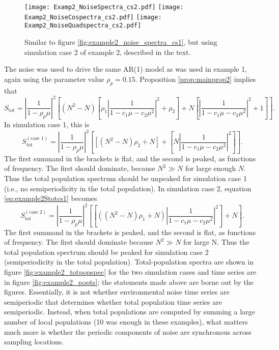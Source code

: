 \documentclass[letterpaper,11pt]{article}
\begin{document}
\begin{figure}
\texttt{[image: Examp2\_NoiseSpectra\_cs2.pdf]}
\texttt{[image: Examp2\_NoiseCospectra\_cs2.pdf]}
\texttt{[image: Examp2\_NoiseQuadspectra\_cs2.pdf]}
\caption{Similar to figure \ref{fig:example2_noise_spectra_cs1}, but using simulation case 2 of example 2, described in the text.}\label{fig:example2_noise_spectra_cs2}
\end{figure}

The noise was used to drive the same AR(1) model as was used in example 1,
again using the parameter value $\rho_p=0.15$. Proposition \ref{prop:mainprop2}
implies that 
\begin{equation}
S_{\text{tot}}=\left| \frac{1}{1-\rho_p \mu} \right|^2
\left[ (N^2-N) \left[ \rho_1 \left| \frac{1}{1-c_1 \mu -c_2 \mu^2} \right|^2+\rho_2 \right] + N\left[ \left| \frac{1}{1-c_1 \mu-c_2 \mu^2} \right|^2+1 \right] \right].
\label{eq:example2Stotcs1}
\end{equation}
In simulation case 1, this is
$$S_{\text{tot}}^{(\text{case 1})}=\left| \frac{1}{1-\rho_p \mu} \right|^2
\left[ [(N^2-N)\rho_2 +N] + \left[ N \left| \frac{1}{1-c_1 \mu -c_2 \mu^2} \right|^2 \right] \right].$$
The first summand in the brackets is flat, and the second is peaked, as functions of 
frequency. The first
should dominate, because
$N^2 \gg N$ for large enough $N$. Thus the total population spectrum should be unpeaked for simulation case 1 (i.e., no semiperiodicity in the total population).
In simulation case 2, equation \ref{eq:example2Stotcs1} becomes
$$S_{\text{tot}}^{(\text{case 2})}=\left| \frac{1}{1-\rho_p \mu} \right|^2
\left[ \left[ ((N^2-N)\rho_1+N)\left| \frac{1}{1-c_1\mu-c_2\mu^2} \right|^2 \right]  +N \right].$$ The first summand in the brackets is peaked, and the second is flat,
as functions of frequency. The first should dominate because $N^2 \gg N$ for large N.
Thus the total population spectrum should be peaked for simulation case 2 
(semiperiodicity in the total population). Total-population spectra are shown in 
figure \ref{fig:example2_totpopspec} for the two simulation cases and time series
are in figure \ref{fig:example2_popts}; the statements made above are borne out by the figures. Essentially, it is not whether environmental noise time series are
semiperiodic that determines whether total population time series are semiperiodic.
Instead, when total populations are computed by summing a large number of local
populations (10 was enough in these examples), what matters much more is whether
the periodic components of noise are synchronous across sampling locations.
\end{document}
